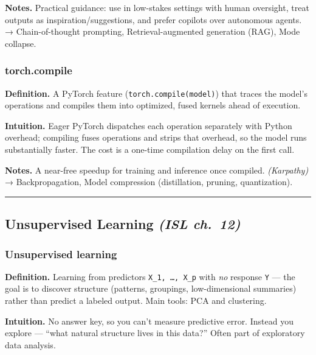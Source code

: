 \documentclass[
  10pt,
  letterpaper,
  onecolumn]{article}
\begin{document}
\textbf{Notes.} Practical guidance: use in low-stakes settings with
human oversight, treat outputs as inspiration/suggestions, and prefer
copilots over autonomous agents. → Chain-of-thought prompting,
Retrieval-augmented generation (RAG), Mode collapse.

\hypertarget{torch.compile}{%
\subsubsection{torch.compile}\label{torch.compile}}

\textbf{Definition.} A PyTorch feature (\texttt{torch.compile(model)})
that traces the model's operations and compiles them into optimized,
fused kernels ahead of execution.

\textbf{Intuition.} Eager PyTorch dispatches each operation separately
with Python overhead; compiling fuses operations and strips that
overhead, so the model runs substantially faster. The cost is a one-time
compilation delay on the first call.

\textbf{Notes.} A near-free speedup for training and inference once
compiled. \emph{(Karpathy)} → Backpropagation, Model compression
(distillation, pruning, quantization).

\begin{center}\rule{0.5\linewidth}{0.5pt}\end{center}

\hypertarget{unsupervised-learning-isl-ch.-12}{%
\subsection{\texorpdfstring{Unsupervised Learning \emph{(ISL
ch.~12)}}{Unsupervised Learning (ISL ch.~12)}}\label{unsupervised-learning-isl-ch.-12}}

\hypertarget{unsupervised-learning}{%
\subsubsection{Unsupervised learning}\label{unsupervised-learning}}

\textbf{Definition.} Learning from predictors \texttt{X\_1,\ …,\ X\_p}
with \emph{no} response \texttt{Y} --- the goal is to discover structure
(patterns, groupings, low-dimensional summaries) rather than predict a
labeled output. Main tools: PCA and clustering.

\textbf{Intuition.} No answer key, so you can't measure predictive
error. Instead you explore --- ``what natural structure lives in this
data?'' Often part of exploratory data analysis.
\end{document}
